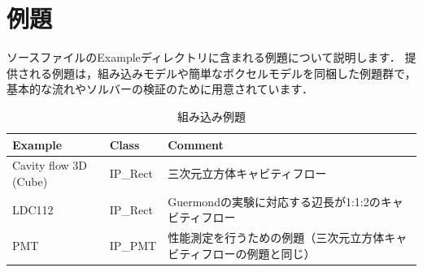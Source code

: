 \pagebreak
% 
\section{例題}
ソースファイルのExampleディレクトリに含まれる\hypertarget{tgt:samples}{例題}について説明します．
提供される例題は，組み込みモデルや簡単なボクセルモデルを同梱した例題群で，
基本的な流れやソルバーの検証のために用意されています．


\begin{table}[htdp]
\caption{組み込み例題}
\begin{center}
\small
\begin{tabular}{lll} \toprule
Example & Class & Comment\\ \midrule
Cavity flow 3D (Cube) & IP\_Rect & 三次元立方体キャビティフロー\\
LDC112  & IP\_Rect & Guermondの実験に対応する辺長が1:1:2のキャビティフロー\\ 
PMT & IP\_PMT & 性能測定を行うための例題（三次元立方体キャビティフローの例題と同じ）\\
\bottomrule
\end{tabular}
\end{center}
\label{tbl:example at glance}
\end{table}


